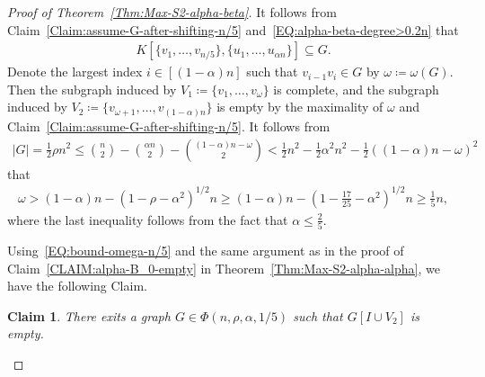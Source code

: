 \documentclass[11pt,a4paper]{article}
\newtheorem{claim}[definition]{Claim}
\begin{document}
\begin{proof}[Proof of Theorem~\ref{Thm:Max-S2-alpha-beta}]
It follows from Claim~\ref{Claim:assume-G-after-shifting-n/5} and~\eqref{EQ:alpha-beta-degree>0.2n} that 
\begin{align}\label{EQ:beta-has-complete-bipartite}
K[\{v_1, \ldots,v_{n/5}\}, \{u_1, \ldots,u_{\alpha n}\}] \subseteq G. 
\end{align}
Denote the largest index $i \in \left[(1-\alpha)n\right]$ such that $v_{i-1}v_i\in  G$ by $\omega \coloneqq \omega(G)$. 
Then the subgraph induced by $V_1 \coloneqq \{v_1,\ldots, v_{\omega}\}$ is complete, and the subgraph induced by $V_2 \coloneqq  \{v_{\omega+1}, \ldots, v_{(1-\alpha)n}\}$ is empty by the maximality of $\omega$ and Claim~\ref{Claim:assume-G-after-shifting-n/5}. 
It follows from 
\begin{align*}
|G| = \frac{1}{2} \rho n^2 
\le \binom{n}{2} - \binom{\alpha n}{2} -\binom{(1-\alpha)n -\omega}{2}
< \frac{1}{2}n^2 - \frac{1}{2}\alpha^2 n^2 -\frac{1}{2}\left((1-\alpha)n -\omega\right)^2
\end{align*}
that 
\begin{align}\label{EQ:bound-omega-n/5}
\omega 
> (1-\alpha)n - \left(1-\rho -\alpha^2 \right)^{1/2}n 
\ge (1-\alpha)n - \left(1-\frac{17}{25} -\alpha^2 \right)^{1/2}n 
\ge \frac{1}{5}n, 
\end{align}
where the last inequality follows from the fact that $\alpha \le \tfrac{2}{5}$. 

Using~\eqref{EQ:bound-omega-n/5} and the same argument as in the proof of Claim~\ref{CLAIM:alpha-B_0-empty} in Theorem~\ref{Thm:Max-S2-alpha-alpha}, we have the following Claim. 

\begin{claim}\label{CLAIM:beta-B_0-empty}
There exits a graph $G \in \Phi(n, \rho, \alpha, 1/5)$ such that $G[I \cup V_2]$ is empty. 
\end{claim}


\end{proof}
\end{document}
